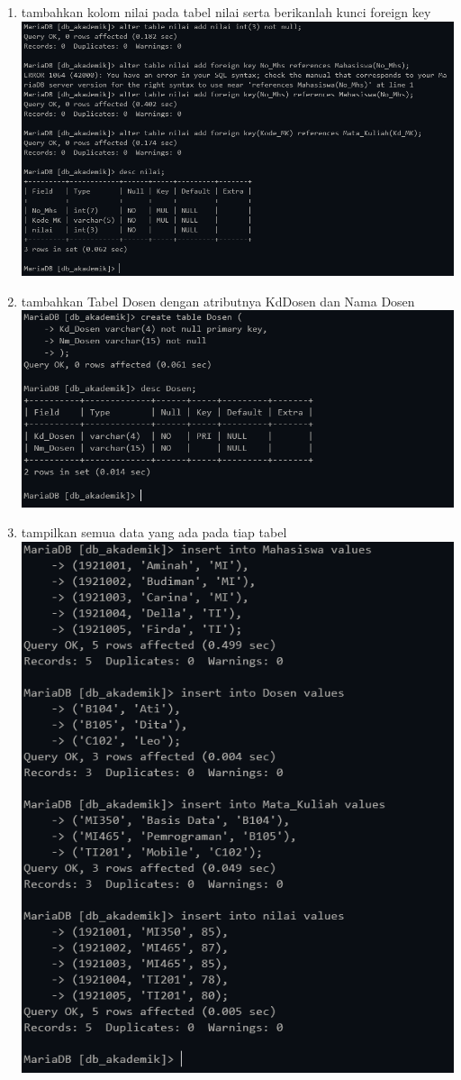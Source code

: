 \documentclass[12pt,titlepage]{article}
\begin{document}
\begin{enumerate}
\begin{enumerate}
        \newpage
        \item tambahkan kolom nilai pada tabel nilai serta berikanlah kunci foreign key \\
        \includegraphics[width=.85\textwidth]{images/figures/tugas-1_c.PNG}
        \item tambahkan Tabel Dosen dengan atributnya Kd\textunderscore Dosen dan Nama Dosen \\
        \includegraphics[width=.85\textwidth]{images/figures/tugas-1_d.PNG}
        \newpage
        \item tampilkan semua data yang ada pada tiap tabel \\
        \includegraphics[width=.85\textwidth]{images/figures/tugas-1_e_1.PNG} \\

\end{enumerate}
\end{enumerate}
\end{document}
